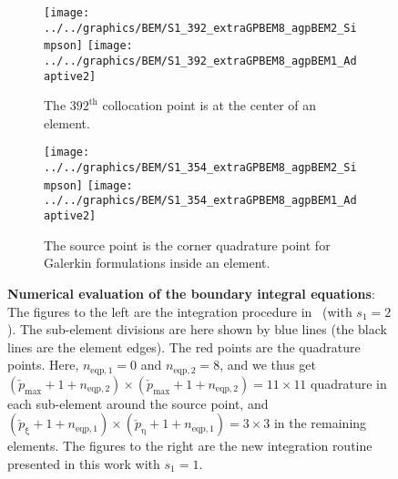 \begin{figure}
	\begin{subfigure}[t]{\textwidth}
		\centering
		\texttt{[image: ../../graphics/BEM/S1\_392\_extraGPBEM8\_agpBEM2\_Simpson]}%
		\hspace*{0.02\textwidth}%
		\texttt{[image: ../../graphics/BEM/S1\_392\_extraGPBEM8\_agpBEM1\_Adaptive2]}
		\caption{The $392^{\mathrm{th}}$ collocation point is at the center of an element.}
	\end{subfigure}
	\par\bigskip
	\par\bigskip
	\begin{subfigure}[t]{\textwidth}
		\centering
		\texttt{[image: ../../graphics/BEM/S1\_354\_extraGPBEM8\_agpBEM2\_Simpson]}%
		\hspace*{0.02\textwidth}%
		\texttt{[image: ../../graphics/BEM/S1\_354\_extraGPBEM8\_agpBEM1\_Adaptive2]}
		\caption{The source point is the corner quadrature point for Galerkin formulations inside an element.}
	\end{subfigure}
	\caption{\textbf{Numerical evaluation of the boundary integral equations}: The figures to the left are the integration procedure in~\cite{Simpson2014aib} (with $s_1=2$). The sub-element divisions are here shown by blue lines (the black lines are the element edges). The red points are the quadrature points. Here, $n_{\mathrm{eqp},1}=0$ and $n_{\mathrm{eqp},2}=8$, and we thus get $(\check{p}_{\mathrm{max}}+1+n_{\mathrm{eqp},2})\times(\check{p}_{\mathrm{max}}+1+n_{\mathrm{eqp},2})=11\times 11$ quadrature in each sub-element around the source point, and $(\check{p}_\upxi+1+n_{\mathrm{eqp},1})\times(\check{p}_\upeta+1+n_{\mathrm{eqp},1})=3\times 3$ in the remaining elements. The figures to the right are the new integration routine presented in this work with $s_1=1$.}
	\label{Fig3:Quadrature2}
\end{figure}